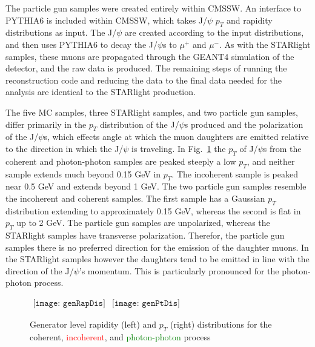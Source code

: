     The particle gun samples were created entirely within CMSSW.
    An interface to PYTHIA6 is included within CMSSW, which takes J/$\psi$
      $p_{T}$ and rapidity distributions as input. 
    The J/$\psi$ are created according to the input distributions, and then uses
      PYTHIA6 to decay the J/$\psi$s to $\mu^{+}$ and $\mu^{-}$.
    As with the STARlight samples, these muons are propagated through the GEANT4
      simulation of the detector, and the raw data is produced.
    The remaining steps of running the reconstruction code and reducing the 
      data to the final data needed for the analysis are identical to the 
      STARlight production.

    The five MC samples, three STARlight samples, and two particle gun samples,
      differ primarily in the $p_{T}$ distribution of the J/$\psi$s produced
      and the polarization of the J/$\psi$s, which effects angle at which
      the muon daughters are emitted relative to the direction in which the
      J/$\psi$ is traveling. 
    In Fig.~\ref{fig:starlightRapPtDist} the $p_{T}$ of J/$\psi$s from the 
      coherent and photon-photon samples are peaked steeply a low $p_{T}$, and 
      neither sample extends much beyond 0.15 GeV in $p_{T}$.
    The incoherent sample is peaked near 0.5 GeV and extends beyond 1 GeV.
    The two particle gun samples resemble the incoherent and coherent samples.
    The first sample has a Gaussian $p_{T}$ distribution extending to 
      approximately 0.15 GeV, whereas the second is flat in $p_{T}$ up to
      2 GeV.
    The particle gun samples are unpolarized, whereas the STARlight samples 
      have transverse polarization. 
    Therefor, the particle gun samples there is no preferred direction for the 
      emission of the daughter muons.
    In the STARlight samples however the daughters tend to be emitted in line
      with the direction of the J/$\psi$'s momentum.
    This is particularly pronounced for the photon-photon process.

    \begin{figure}[!Hhbt]
      \centering
      $ \begin{array}{cc}
        \texttt{[image: genRapDis]} &
        \texttt{[image: genPtDis]}
      \end{array} $
      \caption{Generator level rapidity (left) and $p_{T}$ (right) 
          distributions for the coherent, \textcolor{red}{incoherent}, 
          and \textcolor{green}{photon-photon} process}
      \label{fig:starlightRapPtDist}
    \end{figure}


